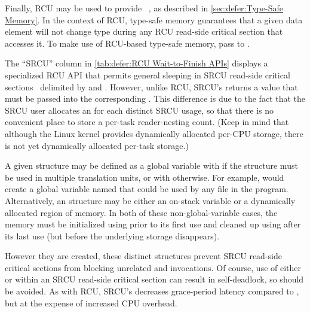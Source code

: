 Finally, RCU may be used to provide
~\cite{Cheriton96a}, as described in
\cref{sec:defer:Type-Safe Memory}.
In the context of RCU, type-safe memory guarantees that a given
data element will not change type during any RCU read-side critical section
that accesses it.
To make use of RCU-based type-safe memory, pass
 to .

The ``SRCU'' column in
\cref{tab:defer:RCU Wait-to-Finish APIs}
displays a specialized RCU API that permits general sleeping in SRCU
read-side critical
sections~\cite{PaulEMcKenney2006c}
delimited by  and .
However, unlike RCU, SRCU's  returns a value that
must be passed into the corresponding .
This difference is due to the fact that the SRCU user allocates an
 for each distinct SRCU usage, so that there is no
convenient place to store a per-task reader-nesting count.
(Keep in mind that although the Linux kernel provides dynamically
allocated per-CPU storage, there is not yet dynamically allocated
per-task storage.)

A given  structure may be defined as a global
variable with  if the structure must be used in
multiple translation units, or with  otherwise.
For example,  would create a global variable
named  that could be used by any file in the program.
Alternatively, an  structure may be either an on-stack
variable or a dynamically allocated region of memory.
In both of these non-global-variable cases, the memory must be initialized
using  prior to its first use and cleaned up
using  after its last use (but before the
underlying storage disappears).

However they are created, these distinct  structures
prevent SRCU read-side critical sections from blocking unrelated
 and 
invocations.
Of course, use of either  or
 within an SRCU read-side critical
section can result in self-deadlock, so should be avoided.
As with RCU, SRCU's  decreases
grace-period latency compared to , but at
the expense of increased CPU overhead.

